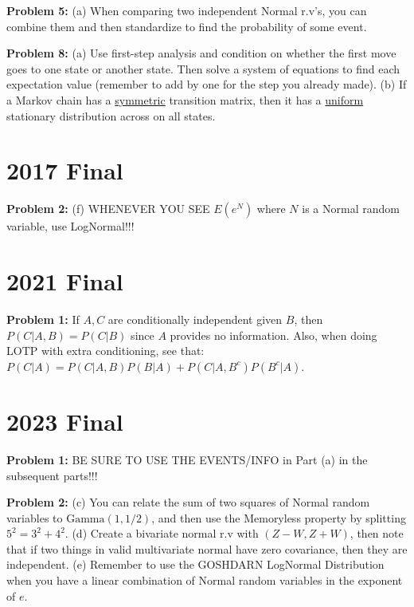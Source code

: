 \documentclass[letterpaper]{article}
\begin{document}
\noindent
\textbf{Problem 5:} (a) When comparing two independent Normal r.v's, you can combine them and then standardize to find the probability of some event. 


\noindent
\textbf{Problem 8:} (a) Use first-step analysis and condition on whether the first move goes to one state or another state. Then solve a system of equations to find each expectation value (remember to add by one for the step you already made). (b) If a Markov chain has a \underline{symmetric} transition matrix, then it has a \underline{uniform} stationary distribution across on all states. 

\section*{2017 Final}

\noindent
\textbf{Problem 2:} (f) WHENEVER YOU SEE $E(e^{N})$ where $N$ is a Normal random variable, use LogNormal!!!

\section*{2021 Final}

\noindent
\textbf{Problem 1:} If $A,C$ are conditionally independent given $B$, then $P(C|A,B) = P(C|B)$ since $A$ provides no information. Also, when doing LOTP with extra conditioning, see that: $P(C|A) = P(C|A,B) P(B|A) + P(C|A,B^c) P(B^c |A)$. 


\section*{2023 Final}
\noindent
\textbf{Problem 1:} BE SURE TO USE THE EVENTS/INFO in Part (a) in the subsequent parts!!!

\noindent
\textbf{Problem 2:} (c) You can relate the sum of two squares of Normal random variables to $\mbox{Gamma}(1,1/2)$, and then use the Memoryless property by splitting $5^2 = 3^2 + 4^2$. (d) Create a bivariate normal r.v with $(Z-W, Z+W)$, then note that if two things in valid multivariate normal have zero covariance, then they are independent. (e) Remember to use the GOSHDARN LogNormal Distribution when you have a linear combination of Normal random variables in the exponent of $e$. 

\end{document}
